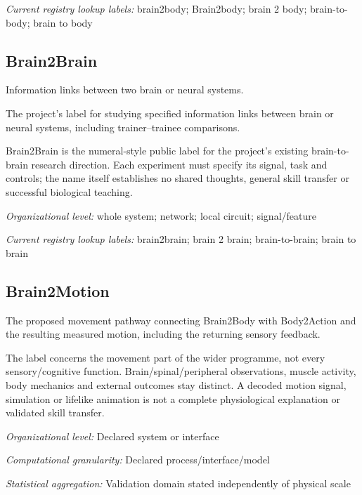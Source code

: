 \noindent\textit{Current registry lookup labels:} brain2body; Brain2body; brain 2 body; brain-to-body; brain to body\par

\subsection*{Brain2Brain}
\noindent Information links between two brain or neural systems.\par
\noindent The project’s label for studying specified information links between brain or neural systems, including trainer–trainee comparisons.\par
\noindent Brain2Brain is the numeral-style public label for the project’s existing brain-to-brain research direction. Each experiment must specify its signal, task and controls; the name itself establishes no shared thoughts, general skill transfer or successful biological teaching.\par
\noindent\textit{Organizational level:} whole system; network; local circuit; signal/feature\par

\noindent\textit{Current registry lookup labels:} brain2brain; brain 2 brain; brain-to-brain; brain to brain\par

\begin{samepage}
\subsection*{Brain2Motion}
\noindent The proposed movement pathway connecting Brain2Body with Body2Action and the resulting measured motion, including the returning sensory feedback.\par
\end{samepage}
\noindent The label concerns the movement part of the wider programme, not every sensory/cognitive function. Brain/spinal/peripheral observations, muscle activity, body mechanics and external outcomes stay distinct. A decoded motion signal, simulation or lifelike animation is not a complete physiological explanation or validated skill transfer.\par
\noindent\textit{Organizational level:} Declared system or interface\par
\noindent\textit{Computational granularity:} Declared process/interface/model\par
\begin{samepage}
\noindent\textit{Statistical aggregation:} Validation domain stated independently of physical scale\par\nopagebreak[4]

\end{samepage}


